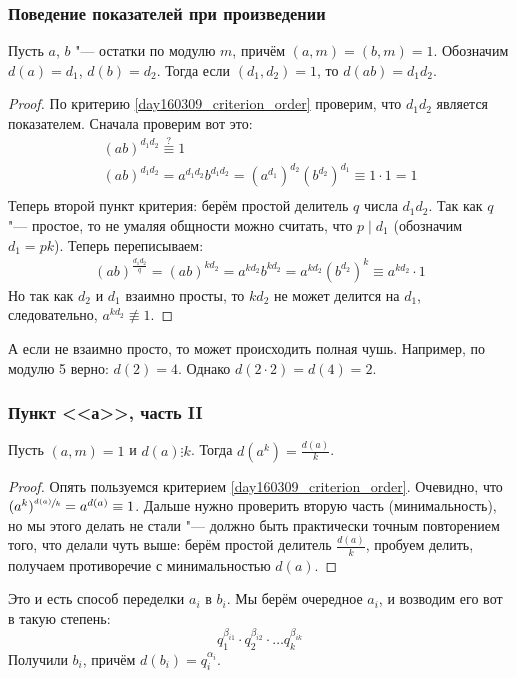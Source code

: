 	\subsubsection{Поведение показателей при произведении}
		\begin{lemma}
			Пусть $a$, $b$ "--- остатки по модулю $m$, причём $(a, m)=(b, m)=1$.
			Обозначим $d(a)=d_1$, $d(b)=d_2$.
			Тогда если $(d_1, d_2)=1$, то $d(ab)=d_1d_2$.
		\end{lemma}
		\begin{proof}
			По критерию \ref{day160309_criterion_order} проверим, что $d_1d_2$ является показателем.
			Сначала проверим вот это:
			\begin{gather*}
				(ab)^{d_1d_2} \stackrel{?}{\equiv} 1 \\
				(ab)^{d_1d_2} = a^{d_1d_2}b^{d_1d_2} = (a^{d_1})^{d_2}(b^{d_2})^{d_1} \equiv 1 \cdot 1 = 1 \\
			\end{gather*}
			Теперь второй пункт критерия: берём простой делитель $q$ числа $d_1d_2$.
			Так как $q$ "--- простое, то не умаляя общности можно считать, что $p\mid d_1$
			(обозначим $d_1=pk$).
			Теперь переписываем:
			\begin{gather*}
				(ab)^{\frac{d_1d_2}q} =
				(ab)^{kd_2} =
				a^{kd_2} b^{kd_2} =
				a^{kd_2} \left(b^{d_2}\right)^{k} \equiv
				a^{kd_2} \cdot 1
			\end{gather*}
			Но так как $d_2$ и $d_1$ взаимно просты, то $kd_2$ не может делится на $d_1$,
			следовательно, $a^{kd_2} \nequiv 1$.
		\end{proof}
		\begin{Rem}
			А если не взаимно просто, то может происходить полная чушь.
			Например, по модулю 5 верно: $d(2)=4$.
			Однако $d(2\cdot 2)=d(4)=2$.
		\end{Rem}

	\subsubsection{Пункт <<а>>, часть II}
		\begin{lemma}
			Пусть $(a, m)=1$ и $d(a)\vdots k$.
			Тогда $d(a^k) = \frac{d(a)}{k}$.
		\end{lemma}
		\begin{proof}
			Опять пользуемся критерием \ref{day160309_criterion_order}.
			Очевидно, что $(a^k)^{\sfrac{d(a)}{k}} = a^{d(a)} \equiv 1$.
			Дальше нужно проверить вторую часть (минимальность), но мы этого делать
			не стали "--- должно быть практически точным повторением того, что делали чуть выше:
			берём простой делитель $\frac{d(a)}{k}$, пробуем делить, получаем противоречие с минимальностью
			$d(a)$.
		\end{proof}
		Это и есть способ переделки $a_i$ в $b_i$.
		Мы берём очередное $a_i$, и возводим его вот в такую степень:
		\[ q_1^{\beta_{i1}} \cdot q_2^{\beta_{i2}} \cdot \dots q_k^{\beta_{ik}} \]
		Получили $b_i$, причём $d(b_i)=q_i^{\alpha_i}$.

